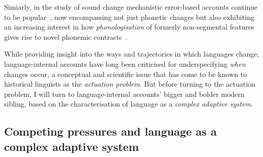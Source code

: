 Simiarly, in the study of sound change mechanistic error-based accounts continue to be popular~\citep[see e.g.][who make specific reference to the importance of \emph{asymmetries} between phonetic variants to explain change]{Garrett2013}, %
now encompassing not just phonetic changes but also exhibiting an increasing interest in how \emph{phonologisation} of formerly non-segmental features gives rise to novel phonemic contrasts~\citep[e.g.][]{Kirby2013}.

While providing insight into the ways and trajectories in which languages change, language-internal accounts have long been criticised for underspecifying \emph{when} changes occur, a conceptual and scientific issue that has come to be known to historical linguists as the \emph{actuation problem}. But before turning to the actuation problem, I will turn to language-internal accounts' bigger and bolder modern sibling, based on the characterisation of language as a \emph{complex adaptive system}.



\subsection{Competing pressures and language as a complex adaptive system}
\label{sec:lcas}

